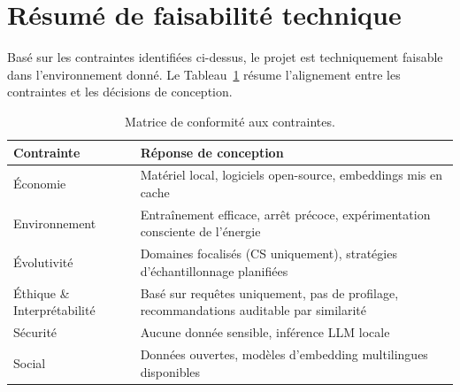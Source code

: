 \section{Résumé de faisabilité technique}

Basé sur les contraintes identifiées ci-dessus, le projet est techniquement faisable dans l'environnement donné. Le Tableau~\ref{tab:feasibility} résume l'alignement entre les contraintes et les décisions de conception.

\begin{table}[htbp]
\centering
\caption{Matrice de conformité aux contraintes.}
\label{tab:feasibility}
\begin{tabular}{ll}
\toprule
\textbf{Contrainte} & \textbf{Réponse de conception} \\
\midrule
Économie & Matériel local, logiciels open-source, embeddings mis en cache \\
Environnement & Entraînement efficace, arrêt précoce, expérimentation consciente de l'énergie \\
Évolutivité & Domaines focalisés (CS uniquement), stratégies d'échantillonnage planifiées \\
Éthique \& Interprétabilité & Basé sur requêtes uniquement, pas de profilage, recommandations auditable par similarité \\
Sécurité & Aucune donnée sensible, inférence LLM locale \\
Social & Données ouvertes, modèles d'embedding multilingues disponibles \\
\bottomrule
\end{tabular}
\end{table}
